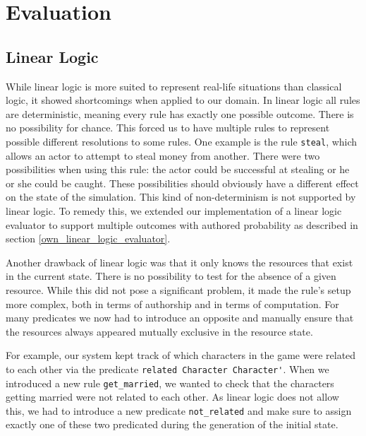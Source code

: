 \section{Evaluation} \label{evaulation}

\subsection{Linear Logic}
While linear logic is more suited to represent real-life situations than classical logic, it showed shortcomings when applied to our domain.
In linear logic all rules are deterministic, meaning every rule has exactly one possible outcome.
There is no possibility for chance.
This forced us to have multiple rules to represent possible different resolutions to some rules.
One example is the rule \lstinline{steal}, which allows an actor to attempt to steal money from another.
There were two possibilities when using this rule: the actor could be successful at stealing or he or she could be caught.
These possibilities should obviously have a different effect on the state of the simulation.
This kind of non-determinism is not supported by linear logic.
To remedy this, we extended our implementation of a linear logic evaluator to support multiple outcomes with authored probability as described in section \ref{own_linear_logic_evaluator}.

Another drawback of linear logic was that it only knows the resources that exist in the current state.
There is no possibility to test for the absence of a given resource.
While this did not pose a significant problem, it made the rule's setup more complex, both in terms of authorship and in terms of computation.
For many predicates we now had to introduce an opposite and manually ensure that the resources always appeared mutually exclusive in the resource state.

For example, our system kept track of which characters in the game were related to each other via the predicate \lstinline{related Character Character'}.
When we introduced a new rule \lstinline{get_married}, we wanted to check that the characters getting married were not related to each other.
As linear logic does not allow this, we had to introduce a new predicate \lstinline{not_related} and make sure to assign exactly one of these two predicated during the generation of the initial state.

